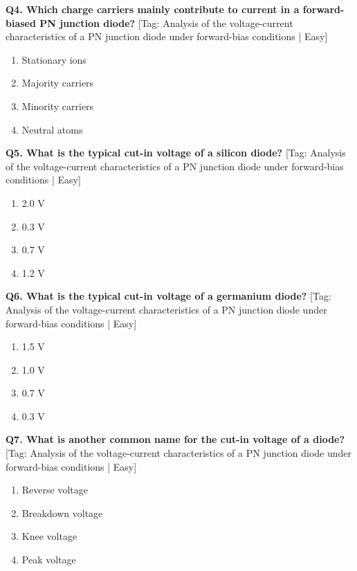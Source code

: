 \noindent\textbf{Q4. Which charge carriers mainly contribute to current in a forward-biased PN junction diode?} \hfill [Tag: Analysis of the voltage-current characteristics of a PN junction diode under forward-bias conditions | Easy]
\begin{enumerate}[label=(\alph*),topsep=2pt,itemsep=1pt,partopsep=0pt,parsep=0pt]
    \item {Stationary ions}
    \item {Majority carriers}
    \item {Minority carriers}
    \item {Neutral atoms}
\end{enumerate}
\vspace{2mm}

\noindent\textbf{Q5. What is the typical cut-in voltage of a silicon diode?} \hfill [Tag: Analysis of the voltage-current characteristics of a PN junction diode under forward-bias conditions | Easy]
\begin{enumerate}[label=(\alph*),topsep=2pt,itemsep=1pt,partopsep=0pt,parsep=0pt]
    \item {2.0 V}
    \item {0.3 V}
    \item {0.7 V}
    \item {1.2 V}
\end{enumerate}
\vspace{2mm}

\noindent\textbf{Q6. What is the typical cut-in voltage of a germanium diode?} \hfill [Tag: Analysis of the voltage-current characteristics of a PN junction diode under forward-bias conditions | Easy]
\begin{enumerate}[label=(\alph*),topsep=2pt,itemsep=1pt,partopsep=0pt,parsep=0pt]
    \item {1.5 V}
    \item {1.0 V}
    \item {0.7 V}
    \item {0.3 V}
\end{enumerate}
\vspace{2mm}

\noindent\textbf{Q7. What is another common name for the cut-in voltage of a diode?} \hfill [Tag: Analysis of the voltage-current characteristics of a PN junction diode under forward-bias conditions | Easy]
\begin{enumerate}[label=(\alph*),topsep=2pt,itemsep=1pt,partopsep=0pt,parsep=0pt]
    \item {Reverse voltage}
    \item {Breakdown voltage}
    \item {Knee voltage}
    \item {Peak voltage}
\end{enumerate}
\vspace{2mm}


